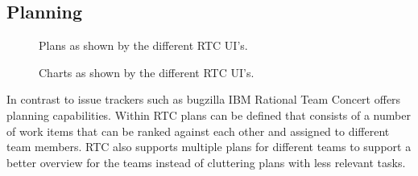 \subsection{Planning}
\begin{figure}[t]
\centering
{}
\caption{Plans as shown by the different RTC UI's.}
\label{fig:plan}
\end{figure}
\begin{figure}[t]
\centering
{}
\caption{Charts as shown by the different RTC UI's.}
\label{fig:charts}
\end{figure}
In contrast to issue trackers such as bugzilla IBM Rational Team Concert offers planning capabilities.
Within RTC plans can be defined that consists of a number of work items that can be ranked against each other and assigned to different team members.
RTC also supports multiple plans for different teams to support a better overview for the teams instead of cluttering plans with less relevant tasks.

